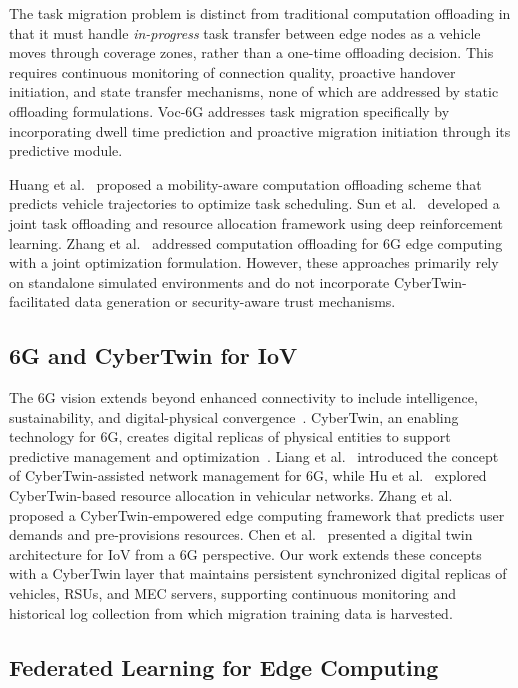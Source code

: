 \documentclass[10pt,letterpaper]{article}
\providecommand{\VocSixG}{Voc-6G}
\begin{document}
The task migration problem is distinct from traditional computation offloading in that it must handle \emph{in-progress} task transfer between edge nodes as a vehicle moves through coverage zones, rather than a one-time offloading decision. This requires continuous monitoring of connection quality, proactive handover initiation, and state transfer mechanisms, none of which are addressed by static offloading formulations. \VocSixG{} addresses task migration specifically by incorporating dwell time prediction and proactive migration initiation through its predictive module.

Huang et al.~\cite{huang2021computation} proposed a mobility-aware computation offloading scheme that predicts vehicle trajectories to optimize task scheduling. Sun et al.~\cite{sun2021drl} developed a joint task offloading and resource allocation framework using deep reinforcement learning. Zhang et al.~\cite{ref_offload1} addressed computation offloading for 6G edge computing with a joint optimization formulation. However, these approaches primarily rely on standalone simulated environments and do not incorporate CyberTwin-facilitated data generation or security-aware trust mechanisms.

\subsection*{6G and CyberTwin for IoV}

The 6G vision extends beyond enhanced connectivity to include intelligence, sustainability, and digital-physical convergence~\cite{zhang20206g, wu2020comprehensive}. CyberTwin, an enabling technology for 6G, creates digital replicas of physical entities to support predictive management and optimization~\cite{liang2022cybertwin}. Liang et al.~\cite{liang2022cybertwin} introduced the concept of CyberTwin-assisted network management for 6G, while Hu et al.~\cite{hu2023cybertwin} explored CyberTwin-based resource allocation in vehicular networks. Zhang et al.~\cite{zhang2022cybertwin} proposed a CyberTwin-empowered edge computing framework that predicts user demands and pre-provisions resources. Chen et al.~\cite{ref_dtIoV} presented a digital twin architecture for IoV from a 6G perspective. Our work extends these concepts with a CyberTwin layer that maintains persistent synchronized digital replicas of vehicles, RSUs, and MEC servers, supporting continuous monitoring and historical log collection from which migration training data is harvested.

\subsection*{Federated Learning for Edge Computing}
\end{document}
